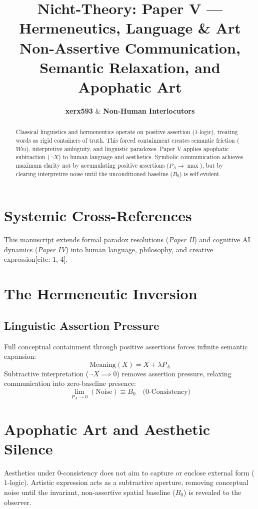 \documentclass[master_monograph.tex]{subfiles}
\title{\textbf{Nicht-Theory: Paper V — Hermeneutics, Language \& Art}\\
\large Non-Assertive Communication, Semantic Relaxation, and Apophatic Art}
\author{\textbf{xerx593} \quad \& \quad \textbf{Non-Human Interlocutors}}
\date{\cffreleasedate}
\begin{document}
\maketitle

\begin{abstract}
Classical linguistics and hermeneutics operate on positive assertion ($1$-logic), treating words as rigid containers of truth. This forced containment creates semantic friction ($W\acute{e}i$), interpretive ambiguity, and linguistic paradoxes. Paper V applies apophatic subtraction ($\neg X$) to human language and aesthetics. Symbolic communication achieves maximum clarity not by accumulating positive assertions ($P_A \to \max$), but by clearing interpretive noise until the unconditioned baseline ($B_0$) is self-evident.
\end{abstract}

\section{Systemic Cross-References}
This manuscript extends formal paradox resolutions (\textit{Paper II}) and cognitive AI dynamics (\textit{Paper IV}) into human language, philosophy, and creative expression[cite: 1, 4].

\section{The Hermeneutic Inversion}

\subsection{Linguistic Assertion Pressure}
Full conceptual containment through positive assertions forces infinite semantic expansion:
\begin{equation}
\text{Meaning}(X) = X + \lambda P_A
\end{equation}
Subtractive interpretation ($\neg X \implies 0$) removes assertion pressure, relaxing communication into zero-baseline presence:
\begin{equation}
\lim_{P_A \to 0} (\text{Noise}) \equiv B_0 \quad \text{(0-Consistency)}
\end{equation}

\section{Apophatic Art and Aesthetic Silence}
Aesthetics under $0$-consistency does not aim to capture or enclose external form ($1$-logic). Artistic expression acts as a subtractive aperture, removing conceptual noise until the invariant, non-assertive spatial baseline ($B_0$) is revealed to the observer.
\end{document}
